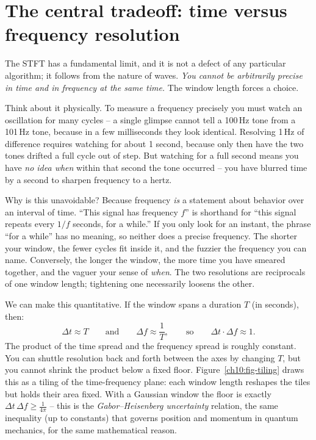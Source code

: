 \section{The central tradeoff: time versus frequency resolution}
\label{ch10:tradeoff}

The STFT has a fundamental limit, and it is not a defect of any particular
algorithm; it follows from the nature of waves. \emph{You cannot be arbitrarily
precise in time and in frequency at the same time.} The window length forces a
choice.

Think about it physically. To measure a frequency precisely you must watch an
oscillation for many cycles -- a single glimpse cannot tell a 100\,Hz tone from a
101\,Hz tone, because in a few milliseconds they look identical. Resolving 1\,Hz
of difference requires watching for about 1 second, because only then have the two
tones drifted a full cycle out of step. But watching for a full second means you
have \emph{no idea when} within that second the tone occurred -- you have blurred
time by a second to sharpen frequency to a hertz.

\begin{whybox}
Why is this unavoidable? Because frequency \emph{is} a statement about behavior
over an interval of time. ``This signal has frequency $f$'' is shorthand for
``this signal repeats every $1/f$ seconds, for a while.'' If you only look for an
instant, the phrase ``for a while'' has no meaning, so neither does a precise
frequency. The shorter your window, the fewer cycles fit inside it, and the
fuzzier the frequency you can name. Conversely, the longer the window, the more
time you have smeared together, and the vaguer your sense of \emph{when}. The two
resolutions are reciprocals of one window length; tightening one necessarily
loosens the other.
\end{whybox}

We can make this quantitative. If the window spans a duration $T$ (in seconds),
then:
\begin{equation}
\label{ch10:res-tradeoff}
\Delta t \approx T \qquad\text{and}\qquad \Delta f \approx \frac{1}{T},
\qquad\text{so}\qquad \Delta t \cdot \Delta f \approx 1 .
\end{equation}
The product of the time spread and the frequency spread is roughly constant. You
can shuttle resolution back and forth between the axes by changing $T$, but you
cannot shrink the product below a fixed floor. Figure~\ref{ch10:fig-tiling} draws
this as a tiling of the time-frequency plane: each window length reshapes the
tiles but holds their area fixed. With a Gaussian window the floor is
exactly $\Delta t\,\Delta f \ge \frac{1}{4\pi}$ -- this is the
\emph{Gabor--Heisenberg uncertainty} relation, the same inequality (up to
constants) that governs position and momentum in quantum mechanics, for the same
mathematical reason.

